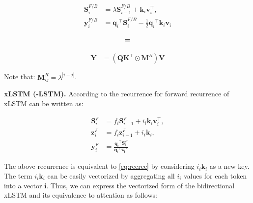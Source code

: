 \begin{minipage}[t]{0.45\textwidth}
\begin{whitebox}
    \begin{align}
        \mathbf{S}^{F/B}_i &= \lambda\mathbf{S}^{F/B}_{i-1} + \mathbf{k}_i \mathbf{v}_i^{\top}, \\
    \mathbf{y}^{F/B}_i &= {{{\mathbf{q}_i}}^{\top} \mathbf{S}^{F/B}_i}  - \frac{1}{2}{{\mathbf{q}_i}}^{\top} \mathbf{k}_i \mathbf{v}_i 
    \end{align}
\end{whitebox}
\end{minipage}
\begin{minipage}[t]{0.1\textwidth}
\vspace{-1.5cm}
    \begin{align}
       \textbf{=} \notag
    \end{align}
\end{minipage}
\begin{minipage}[t]{0.4\textwidth}
\vspace{-1.5cm}
\begin{whitebox}
    \begin{align}
        \mathbf{Y} &= (\mathbf{Q}\mathbf{K}^{\top} \odot \mathbf{M}^R)\mathbf{V}
    \end{align}
\end{whitebox}
\end{minipage}

Note that:  $\mathbf{M}^R_{ij} = \lambda^{|i-j|}$.

\textbf{xLSTM (\lion-\textsc{LSTM}).} According to \cite{xlstm} the recurrence for forward recurrence of xLSTM can be written as:

\begin{align}
     \mathbf{S}_i^F &=   f_i\mathbf{S}_{i-1}^F + i_i\mathbf{k}_i \mathbf{v}_i^{\top}, \\
     \mathbf{z}_i^F & =   f_i\mathbf{z}_{i-1}^F + i_i{\mathbf{k}_i}, \\
     \mathbf{y}_i^F &= \frac{{{\mathbf{q}_i}}^{\top}  \mathbf{S}_i^F}{{{\mathbf{q}_i}}^{\top}  \mathbf{z_i}^F} 
\end{align}

The above recurrence is equivalent to \eqref{eq:recrec} by considering \(i_i \mathbf{k}_i\) as a new key. The term \(i_i \mathbf{k}_i\) can be easily vectorized by aggregating all \(i_i\) values for each token into a vector \(\mathbf{i}\). Thus, we can express the vectorized form of the bidirectional xLSTM and its equivalence to attention as follows:

